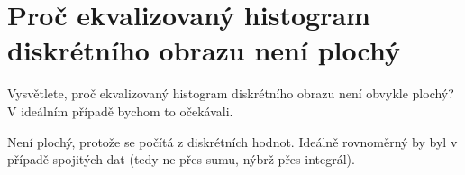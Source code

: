 \section{Proč ekvalizovaný histogram diskrétního obrazu není plochý}
Vysvětlete, proč ekvalizovaný histogram diskrétního obrazu není obvykle plochý? V ideálním případě bychom to očekávali.

Není plochý, protože se počítá z diskrétních hodnot. Ideálně rovnoměrný by byl v případě spojitých dat (tedy ne přes 
sumu, nýbrž přes integrál).